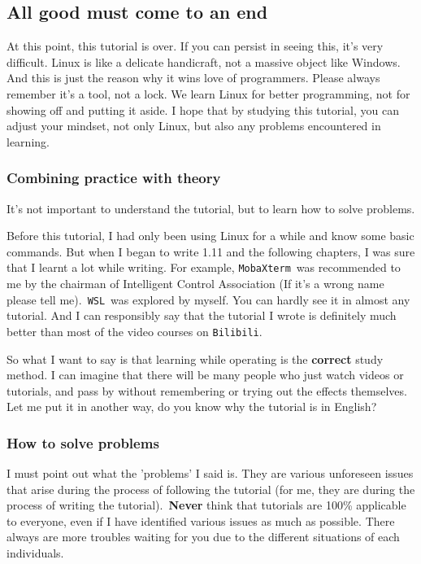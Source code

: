 \documentclass[12pt]{ctexart}
\begin{document}
\subsection*{\textbf{All good must come to an end}}

At this point, this tutorial is over. If you can persist in seeing this,
it's very difficult. Linux is like a delicate
handicraft, not a massive object like Windows. And this is just the
reason why it wins love of programmers. Please always remember
it's a tool, not a lock. We learn Linux for better
programming, not for showing off and putting it aside. I hope that by
studying this tutorial, you can adjust your mindset, not only Linux, but
also any problems encountered in learning.

\subsubsection*{\textbf{Combining practice with theory}}

It's not important to understand the tutorial, but to
learn how to solve problems.

Before this tutorial, I had only been using Linux for a while and know
some basic commands. But when I began to write 1.11 and the following
chapters, I was sure that I learnt a lot while writing. For example,
\texttt{MobaXterm}\ was recommended to me by the chairman of Intelligent
Control Association (If it's a wrong name please tell
me).\ \texttt{WSL}\ was explored by myself. You can hardly see it in
almost any tutorial. And I can responsibly say that the tutorial I wrote
is definitely much better than most of the video courses on
\texttt{Bilibili}.

So what I want to say is that learning while operating is the
\textbf{correct} study method. I can imagine that there will be many
people who just watch videos or tutorials, and pass by without
remembering or trying out the effects themselves. Let me put it in
another way, do you know why the tutorial is in English?

\subsubsection*{\textbf{How to solve problems}}

I must point out what the 'problems' I
said is. They are various unforeseen issues that arise during the
process of following the tutorial (for me, they are during the process
of writing the tutorial).\ \textbf{Never} think that tutorials are 100\%
applicable to everyone, even if I have identified various issues as much
as possible. There always are more troubles waiting for you due to the
different situations of each individuals.
\end{document}
